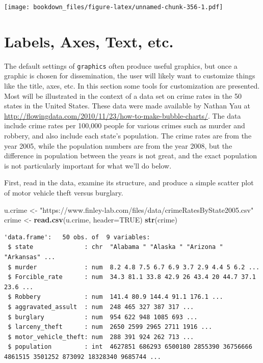 \documentclass[
]{krantz}
\makeatletter
\newenvironment{Shaded}{\begin{snugshade}}{\end{snugshade}}
\newcommand{\DataTypeTok}[1]{\textcolor[rgb]{0.27,0.27,0.27}{#1}}
\newcommand{\KeywordTok}[1]{\textcolor[rgb]{0.27,0.27,0.27}{\textbf{#1}}}
\newcommand{\NormalTok}[1]{#1}
\newcommand{\OtherTok}[1]{\textcolor[rgb]{0.37,0.37,0.37}{#1}}
\newcommand{\StringTok}[1]{\textcolor[rgb]{0.5,0.5,0.5}{#1}}
\newenvironment{kframe}{%
\medskip{}
\setlength{\fboxsep}{.8em}
 \def\at@end@of@kframe{}%
 \ifinner\ifhmode%
  \def\at@end@of@kframe{\end{minipage}}%
  \begin{minipage}{\columnwidth}%
 \fi\fi%
 \def\FrameCommand##1{\hskip\@totalleftmargin \hskip-\fboxsep
 \colorbox{shadecolor}{##1}\hskip-\fboxsep
     \hskip-\linewidth \hskip-\@totalleftmargin \hskip\columnwidth}%
 \MakeFramed {\advance\hsize-\width
   \@totalleftmargin\z@ \linewidth\hsize
   \@setminipage}}%
 {\par\unskip\endMakeFramed%
 \at@end@of@kframe}
\renewenvironment{Shaded}{\begin{kframe}}{\end{kframe}}
\makeatother
\begin{document}
\texttt{[image: bookdown\_files/figure-latex/unnamed-chunk-356-1.pdf]}

\hypertarget{graphics3}{%
\section{Labels, Axes, Text, etc.}\label{graphics3}}

The default settings of \texttt{graphics} often produce useful graphics, but once a graphic is chosen for dissemination, the user will likely want to customize things like the title, axes, etc. In this section some tools for customization are presented. Most will be illustrated in the context of a data set on crime rates in the 50 states in the United States. These data were made available by Nathan Yau at \url{http://flowingdata.com/2010/11/23/how-to-make-bubble-charts/}. The data include crime rates per 100,000 people for various crimes such as murder and robbery, and also include each state's population. The crime rates are from the year 2005, while the population numbers are from the year 2008, but the difference in population between the years is not great, and the exact population is not particularly important for what we'll do below.

First, read in the data, examine its structure, and produce a simple scatter plot of motor vehicle theft versus burglary.

\begin{Shaded}
\begin{Highlighting}[]
\NormalTok{u.crime \textless{}{-}}\StringTok{ "https://www.finley{-}lab.com/files/data/crimeRatesByState2005.csv"}
\NormalTok{crime \textless{}{-}}\StringTok{ }\KeywordTok{read.csv}\NormalTok{(u.crime, }\DataTypeTok{header=}\OtherTok{TRUE}\NormalTok{)}
\KeywordTok{str}\NormalTok{(crime)}
\end{Highlighting}
\end{Shaded}

\begin{verbatim}
'data.frame':	50 obs. of  9 variables:
 $ state              : chr  "Alabama " "Alaska " "Arizona " "Arkansas" ...
 $ murder             : num  8.2 4.8 7.5 6.7 6.9 3.7 2.9 4.4 5 6.2 ...
 $ Forcible_rate      : num  34.3 81.1 33.8 42.9 26 43.4 20 44.7 37.1 23.6 ...
 $ Robbery            : num  141.4 80.9 144.4 91.1 176.1 ...
 $ aggravated_assult  : num  248 465 327 387 317 ...
 $ burglary           : num  954 622 948 1085 693 ...
 $ larceny_theft      : num  2650 2599 2965 2711 1916 ...
 $ motor_vehicle_theft: num  288 391 924 262 713 ...
 $ population         : int  4627851 686293 6500180 2855390 36756666 4861515 3501252 873092 18328340 9685744 ...
\end{verbatim}
\end{document}
